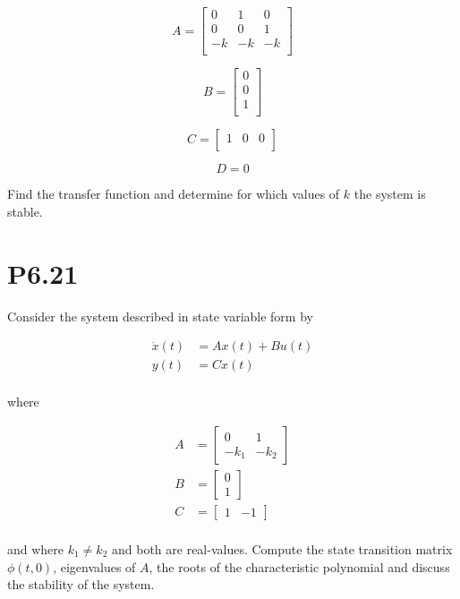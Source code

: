 \documentclass[11pt]{article}
\begin{document}
\[
    A =
    \begin{bmatrix}
        0 & 1 & 0 \\
        0 & 0 & 1 \\
        -k & -k & -k \\
    \end{bmatrix}
\]

\[
    B =
    \begin{bmatrix}
        0 \\
        0 \\
        1 \\
    \end{bmatrix}    
\]

\[
    C =
    \begin{bmatrix}
        1 & 0 & 0 \\
    \end{bmatrix}
\]

\[
    D = 0
\]

Find the transfer function and determine for which values of $k$ the system is stable.

\section{P6.21}

Consider the system described in state variable form by

\begin{align*}
    \dot x(t) &= Ax(t) + Bu(t) \\
    y(t) &= Cx(t) \\
\end{align*}

where

\begin{align*}
    A &= \begin{bmatrix} 0 & 1 \\ -k_1 & -k_2 \end{bmatrix} \\
    B &= \begin{bmatrix} 0 \\ 1 \end{bmatrix} \\
    C &= \begin{bmatrix} 1 & -1 \end{bmatrix} \\
\end{align*}

and where $k_1 \neq k_2$ and both are real-values. Compute the state transition matrix $\phi(t, 0)$, eigenvalues of $A$, the roots of the characteristic polynomial and discuss the stability of the system.
\end{document}
